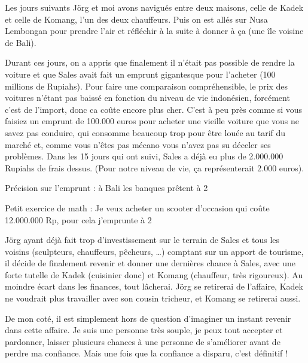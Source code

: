 \begin{multicols}{2}
Les jours suivants Jörg et moi avons navigués entre deux maisons, celle de Kadek et celle de Komang, l’un des deux chauffeurs. Puis on est allés sur Nusa Lembongan pour prendre l’air et réfléchir à la suite à donner à ça (une île voisine de Bali).

Durant ces jours, on a appris que finalement il n’était pas possible de rendre la voiture et que Sales avait fait un emprunt gigantesque pour l’acheter (100 millions de Rupiahs). Pour faire une comparaison compréhensible, le prix des voitures n’étant pas baissé en fonction du niveau de vie indonésien, forcément c’est de l’import, donc ca coûte encore plus cher. C’est à peu près comme si vous faisiez un emprunt de 100.000 euros pour acheter une vieille voiture que vous ne savez pas conduire, qui consomme beaucoup trop pour être louée au tarif du marché et, comme vous n’êtes pas mécano vous n’avez pas su déceler ses problèmes. Dans les 15 jours qui ont suivi, Sales a déjà eu plus de 2.000.000 Rupiahs de frais dessus. (Pour notre niveau de vie, ça représenterait 2.000 euros).

Précision sur l’emprunt : à Bali les banques prêtent à 2 %

Petit exercice de math : Je veux acheter un scooter d’occasion qui coûte 12.000.000 Rp, pour cela j’emprunte à 2%

Jörg ayant déjà fait trop d’investissement sur le terrain de Sales et tous les voisins (sculpteurs, chauffeurs, pêcheurs, …) comptant sur un apport de tourisme, il décide de finalement revenir et donner une dernières chance à Sales, avec une forte tutelle de Kadek (cuisinier donc) et Komang (chauffeur, très rigoureux). Au moindre écart dans les finances, tout lâcherai. Jörg se retirerai de l’affaire, Kadek ne voudrait plus travailler avec son cousin tricheur, et Komang se retirerai aussi.

De mon coté, il est simplement hors de question d’imaginer un instant revenir dans cette affaire. Je suis une personne très souple, je peux tout accepter et pardonner, laisser plusieurs chances à une personne de s’améliorer avant de perdre ma confiance. Mais une fois que la confiance a disparu, c’est définitif !


\end{multicols}
